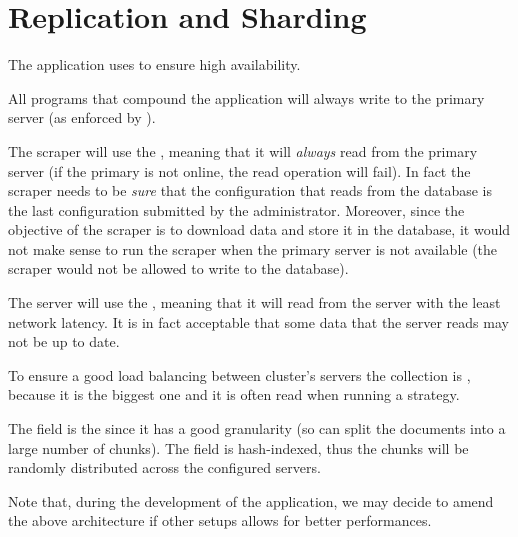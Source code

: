 \section{Replication and Sharding}\label{sec:distributed}

The application uses  to ensure high availability.

All programs that compound the application will always write to the primary
server (as enforced by \mongodb).

The scraper will use the  ,
meaning that it will \emph{always} read from the primary server (if the primary
is not online, the read operation will fail). In fact the scraper needs to be
\emph{sure} that the configuration that reads from the database is the last
configuration submitted by the administrator. Moreover, since the objective of
the scraper is to download data and store it in the database, it would not make
sense to run the scraper when the primary server is not available (the scraper
would not be allowed to write to the database).

The server will use the  ,
meaning that it will read from the server with the least network latency. It is
in fact acceptable that some data that the server reads may not be up to date.

To ensure a good load balancing between cluster's servers the
 collection is , because it is the biggest
one and it is often read when running a strategy.

The  field is the  since it has a good
granularity (so \mongodb{} can split the documents into a large number of
chunks). The field is hash-indexed, thus the chunks will be randomly distributed
across the configured servers.

Note that, during the development of the application, we may decide to amend the
above architecture if other setups allows for better performances.
